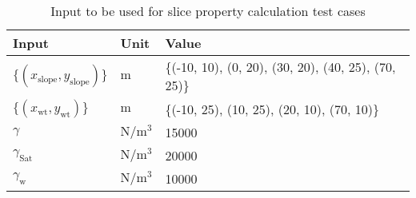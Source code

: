 \documentclass[12pt, titlepage]{article}
\begin{document}
\begin{table}[!h]
	\renewcommand{\arraystretch}{1.5}
	\begin{tabularx}{1.0\textwidth}{p{3cm} l X}
		\toprule \textbf{Input} &
		\textbf{Unit} & \textbf{Value}\\ \midrule
		$\{\left(x_\text{slope},y_\text{slope}\right)\}$ & $\text{m}$ & \{(-10, 
		10), (0, 20), (30, 20), (40, 25), (70, 25)\}\\
		$\{\left(x_\text{wt},y_\text{wt}\right)\}$ & $\text{m}$ & \{(-10, 25),
		(10, 25), (20, 10), (70, 10)\}\\
		$\gamma$ & $\si{\newton\per\meter\cubed}$ & 15000 \\
		$\gamma_{\text{Sat}}$ & $\si{\newton\per\meter\cubed}$ & 20000 \\
		$\gamma_{\text{w}}$ & $\si{\newton\per\meter\cubed}$ & 10000 \\ 
		\bottomrule
	\end{tabularx}
	\caption{Input to be used for slice property calculation test cases}
	\label{SlicePropInputs}
\end{table}
\end{document}
